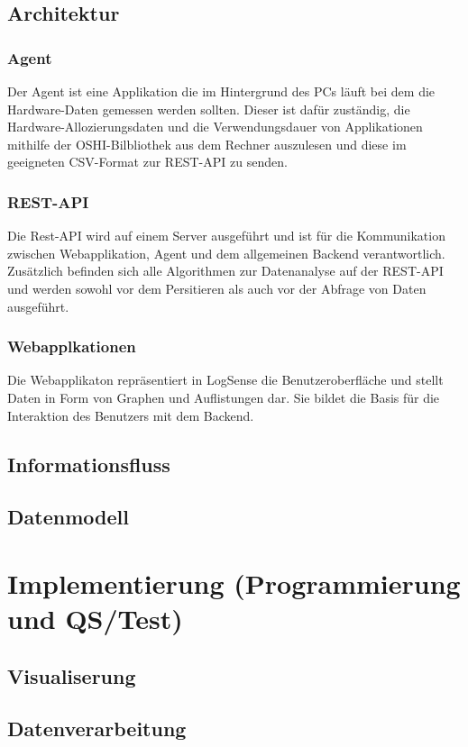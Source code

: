 \documentclass{report}
\begin{document}
\section{Architektur}
\subsection{Agent}
Der Agent ist eine Applikation die im Hintergrund des PCs läuft bei dem die Hardware-Daten gemessen werden sollten. Dieser ist dafür zuständig, die Hardware-Allozierungsdaten und die Verwendungsdauer von Applikationen mithilfe der OSHI-Bilbliothek aus dem Rechner auszulesen und diese im geeigneten CSV-Format zur REST-API zu senden. 
\subsection{REST-API}
Die Rest-API wird auf einem Server ausgeführt und ist für die Kommunikation zwischen Webapplikation, Agent und dem allgemeinen Backend verantwortlich. Zusätzlich befinden sich alle Algorithmen zur Datenanalyse auf der REST-API und werden sowohl vor dem Persitieren als auch vor der Abfrage von Daten ausgeführt.
\subsection{Webapplkationen}
Die Webapplikaton repräsentiert in LogSense die Benutzeroberfläche und stellt Daten in Form von Graphen und Auflistungen dar. Sie bildet die Basis für die Interaktion des Benutzers mit dem Backend.
\section{Informationsfluss}
\section{Datenmodell}

\chapter{Implementierung (Programmierung und QS/Test)}
\section{Visualiserung}
\section{Datenverarbeitung}
\end{document}
